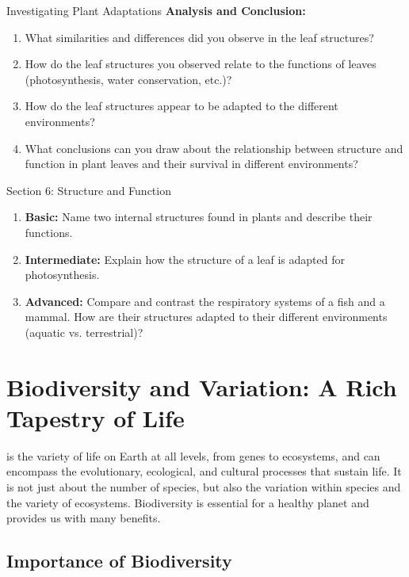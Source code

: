 \begin{investigation}{Investigating Plant Adaptations}
\textbf{Analysis and Conclusion:}
\begin{enumerate}
    \item What similarities and differences did you observe in the leaf structures?
    \item How do the leaf structures you observed relate to the functions of leaves (photosynthesis, water conservation, etc.)?
    \item How do the leaf structures appear to be adapted to the different environments?
    \item What conclusions can you draw about the relationship between structure and function in plant leaves and their survival in different environments?
\end{enumerate}
\end{investigation}


\begin{tieredquestions}{Section 6: Structure and Function}
\begin{enumerate}
    \item \textbf{Basic:} Name two internal structures found in plants and describe their functions.
    \item \textbf{Intermediate:} Explain how the structure of a leaf is adapted for photosynthesis.
    \item \textbf{Advanced:}  Compare and contrast the respiratory systems of a fish and a mammal. How are their structures adapted to their different environments (aquatic vs. terrestrial)?
\end{enumerate}
\end{tieredquestions}


\section{Biodiversity and Variation: A Rich Tapestry of Life}

 is the variety of life on Earth at all levels, from genes to ecosystems, and can encompass the evolutionary, ecological, and cultural processes that sustain life. It is not just about the number of species, but also the variation within species and the variety of ecosystems.  Biodiversity is essential for a healthy planet and provides us with many benefits.

\subsection{Importance of Biodiversity}

